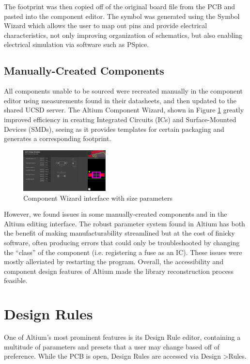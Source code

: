 \documentclass[twocolumn]{article}
\begin{document}
The footprint was then copied off of the original board file from the PCB and pasted into the component editor. The symbol was generated using the Symbol Wizard which allows the user to map out pins and provide electrical characteristics, not only improving organization of schematics, but also enabling electrical simulation via software such as PSpice.

\subsection{Manually-Created Components}
All components unable to be sourced were recreated manually in the component editor using measurements found in their datasheets, and then updated to the shared UCSD server. The Altium Component Wizard, shown in Figure \ref{fig:component-wizard} greatly improved efficiency in creating Integrated Circuits (ICs) and Surface-Mounted Devices (SMDs), seeing as it provides templates for certain packaging and generates a corresponding footprint.

\begin{figure}[ht]
    \centering
    \includegraphics[width=0.4\textwidth]{component wizard.png}
    \caption{Component Wizard interface with size parameters}
    \label{fig:component-wizard}
\end{figure}

However, we found issues in some manually-created components and in the Altium editing interface. The robust parameter system found in Altium has both the benefit of making manufacturability streamlined but at the cost of finicky software, often producing errors that could only be troubleshooted by changing the ``class'' of the component (i.e. registering a fuse as an IC). These issues were mostly alleviated by restarting the program. Overall, the accessibility and component design features of Altium made the library reconstruction process feasible.

\section{Design Rules}

One of Altium's most prominent features is its Design Rule editor, containing a multitude of parameters and presets that a user may change based off of preference. While the PCB is open, Design Rules are accessed via Design \textgreater Rules.
\end{document}
